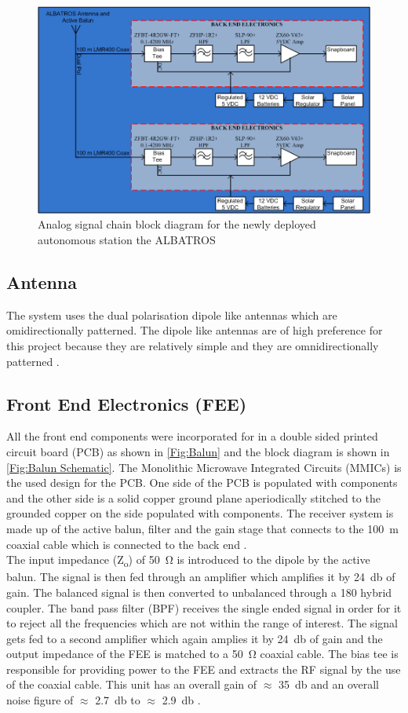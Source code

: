 \documentclass{ws-jai}
\begin{document}
\begin{figure}[h]
	\begin{center}
		\includegraphics[width=0.7\linewidth]{Figures/Signal-Chain.png}
		\caption{Analog signal chain block diagram for the newly deployed autonomous station the ALBATROS}
		\label{Fig:Signal Chain}
	\end{center}
\end{figure}

\subsection{Antenna}	
The system uses the dual polarisation dipole like antennas which are omidirectionally patterned. The dipole like antennas are of high preference for this project because they are relatively simple and they are omnidirectionally patterned \cite{Memo28}.

\subsection{Front End Electronics (FEE)}
All the front end components were incorporated for in a double sided printed circuit board (PCB) as shown in \autoref{Fig:Balun} and the block diagram is shown in \autoref{Fig:Balun Schematic}. The Monolithic Microwave Integrated Circuits (MMICs) is the used design for the PCB. One side of the PCB is populated with components and the other side is a solid copper ground plane aperiodically stitched to the grounded copper on the side populated with components. The receiver system is made up of the active balun, filter and the gain stage that connects to the \SI{100}{\metre} coaxial cable which is connected to the back end \cite{2012PASP..124.1090H}.\\ 
The input impedance (Z\textsubscript{o}) of \SI{50}{\ohm} is introduced to the dipole by the active balun. The signal is then fed through an amplifier which amplifies it by \SI{+24}{\decibel} of gain. The balanced signal is then converted to unbalanced through a 180 \degree hybrid coupler. The band pass filter (BPF) receives the single ended signal in order for it to reject all the frequencies which are not within the range of interest. The signal gets fed to a second amplifier which again amplies it by \SI{+24}{\decibel} of gain and the output impedance of the FEE is matched to a \SI{50}{\ohm} coaxial cable. The bias tee is responsible for providing power to the FEE and extracts the RF signal by the use of the coaxial cable. This unit has an overall gain of $\approx$ \SI{35}{\decibel} and an overall noise figure of $\approx$ \SI{2.7}{\decibel} to $\approx$ \SI{2.9}{\decibel} \cite{Memo35}.
\end{document}
